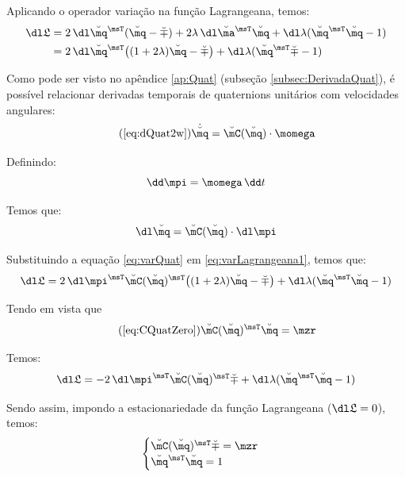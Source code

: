 \documentclass[]{politex}
\begin{document}
Aplicando o operador variação na função Lagrangeana, temos:
\begin{equation} \label{eq:varLagrangeana1}
\begin{split}
\dl \mathfrak{L} &= 2 \, \dl \breve{\mq}^\msT (\breve{\mq} -\breve{\mp}) + 2\lambda \, \dl \breve{\ma}^\msT \breve{\mq} + \dl \lambda(\breve{\mq}^\msT \breve{\mq} - 1) \\
&= 2 \, \dl \breve{\mq}^\msT \big((1+2\lambda)\breve{\mq} -\breve{\mp} \big) + \dl \lambda(\breve{\mq}^\msT \breve{\mp} - 1) \\
\end{split}
\end{equation}

Como pode ser visto no apêndice \ref{ap:Quat} (subseção \ref{subsec:DerivadaQuat}), é possível relacionar derivadas temporais de quaternions unitários com velocidades angulares:
\begin{equation} \tag{\ref{eq:dQuat2w}}
\dot{\breve{\mq}} = \breve{\mC}(\breve{\mq}) \cdot \momega
\end{equation}

Definindo:
\begin{equation}
\dd \mpi = \momega  \, \dd t
\end{equation}

Temos que:
\begin{equation} \label{eq:varQuat}
\dl \breve{\mq} = \breve{\mC}(\breve{\mq}) \cdot \dl \mpi
\end{equation}

Substituindo a equação \eqref{eq:varQuat} em \eqref{eq:varLagrangeana1}, temos que:
\begin{equation}
\dl \mathfrak{L} = 2 \, \dl \mpi^\msT \breve{\mC}(\breve{\mq})^\msT \big((1+2\lambda)\breve{\mq} -\breve{\mp} \big) + \dl \lambda(\breve{\mq}^\msT \breve{\mq} - 1) \\
\end{equation}

Tendo em vista que
\begin{equation} \tag{\ref{eq:CQuatZero}}
\breve{\mC} (\breve{\mq})^\msT \breve{\mq} = \mzr
\end{equation}

Temos:
\begin{equation}
\dl \mathfrak{L} = -2 \, \dl \mpi^\msT \breve{\mC} (\breve{\mq}) ^\msT \breve{\mp}  + \dl \lambda(\breve{\mq}^\msT \breve{\mq} - 1) \\
\end{equation}

Sendo assim, impondo a estacionariedade da função Lagrangeana ($\dl \mathfrak{L} = 0$), temos:
\begin{equation}
\begin{cases}
\breve{\mC}(\breve{\mq})^\msT \breve{\mp} = \mzr \\
\breve{\mq}^\msT \breve{\mq} = 1
\end{cases}
\end{equation}
\end{document}
